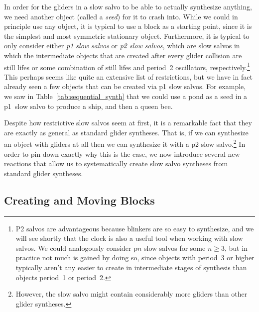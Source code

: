 In order for the gliders in a slow salvo to be able to actually synthesize anything, we need another object (called a \emph{seed}) for it to crash into. While we could in principle use any object, it is typical to use a block as a starting point, since it is the simplest and most symmetric stationary object. Furthermore, it is typical to only consider either \emph{p1 slow salvos} or \emph{p2 slow salvos}, which are slow salvos in which the intermediate objects that are created after every glider collision are still lifes or some combination of still lifes and period~2 oscillators, respectively.\footnote{P2 salvos are advantageous because blinkers are so easy to synthesize, and we will see shortly that the clock is also a useful tool when working with slow salvos. We could analogously consider p$n$ slow salvos for some $n \geq 3$, but in practice not much is gained by doing so, since objects with period~3 or higher typically aren't any easier to create in intermediate stages of synthesis than objects period~1 or period~2.} This perhaps seems like quite an extensive list of restrictions, but we have in fact already seen a few objects that can be created via p1 slow salvos. For example, we saw in Table~\ref{tab:sequential_synth} that we could use a pond as a seed in a p1~slow salvo to produce a ship, and then a queen bee.%

Despite how restrictive slow salvos seem at first, it is a remarkable fact that they are exactly as general as standard glider syntheses. That is, if we can synthesize an object with gliders at all then we can synthesize it with a p2 slow salvo.\footnote{However, the slow salvo might contain considerably more gliders than other glider syntheses.} In order to pin down exactly why this is the case, we now introduce several new reactions that allow us to systematically create slow salvo syntheses from standard glider syntheses.


\subsection{Creating and Moving Blocks}\label{sec:slow_salvo_blocks}

